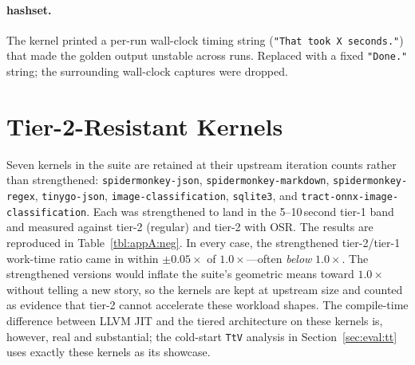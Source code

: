 \paragraph{hashset.} The kernel printed a per-run wall-clock timing string (\texttt{"That took X seconds."}) that made the golden output unstable across runs. Replaced with a fixed \texttt{"Done."} string; the surrounding wall-clock captures were dropped.

\section{Tier-2-Resistant Kernels}
\label{sec:appA:neg}

Seven kernels in the suite are retained at their upstream iteration counts rather than strengthened: \texttt{spidermonkey-json}, \texttt{spidermonkey-markdown}, \texttt{spidermonkey-regex}, \texttt{tinygo-json}, \texttt{image-classification}, \texttt{sqlite3}, and \texttt{tract-onnx-image-classification}. Each was strengthened to land in the 5--10\,second tier-1 band and measured against tier-2 (regular) and tier-2 with OSR. The results are reproduced in Table~\ref{tbl:appA:neg}. In every case, the strengthened tier-2/tier-1 work-time ratio came in within $\pm 0.05\times$ of $1.0\times$---often \emph{below} $1.0\times$. The strengthened versions would inflate the suite's geometric means toward $1.0\times$ without telling a new story, so the kernels are kept at upstream size and counted as evidence that tier-2 cannot accelerate these workload shapes. The compile-time difference between LLVM JIT and the tiered architecture on these kernels is, however, real and substantial; the cold-start \texttt{TtV} analysis in Section~\ref{sec:eval:tt} uses exactly these kernels as its showcase.

